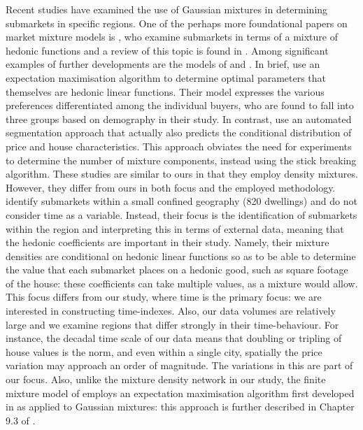 Recent studies have examined the use of Gaussian mixtures in determining submarkets in specific regions.
One of the perhaps more foundational papers on market mixture models is \cite{goodman_thibodeau_jhe1998}, who examine submarkets in terms of a mixture of hedonic functions and a review of this topic is found in \cite{islam_rurds2009}.
Among significant examples of further developments are the models of  \cite{belasco_jrer2012} and \cite{nishi_jhe2021}. In brief, \cite{belasco_jrer2012} use an expectation maximisation algorithm to determine optimal parameters that themselves are hedonic linear functions. Their model expresses the various preferences differentiated among the individual buyers, who are found to fall into three groups based on demography in their study. In contrast, \cite{nishi_jhe2021} use an automated segmentation approach that actually also predicts the conditional distribution of price and house characteristics. This approach obviates the need for experiments to determine the number of mixture components, instead using the stick breaking algorithm. These studies are similar to ours in that they employ density mixtures. However, they differ from ours in both focus and the employed methodology.  \cite{belasco_jrer2012} identify submarkets within a small confined geography (820 dwellings) and do not consider time as a variable. Instead, their focus is the identification of submarkets within the region and interpreting this in terms of external data, meaning that the hedonic coefficients are important in their study. Namely, their mixture densities are conditional on hedonic linear functions so as to be able to determine the value that each submarket places on a hedonic good, such as square footage of the house: these coefficients can take multiple values, as a mixture would allow.  This focus differs from our study, where time is the primary focus: we are interested in constructing time-indexes.
Also,  our data volumes are relatively large and we examine regions that differ strongly in their time-behaviour. For instance, the decadal time scale of our data means that doubling or tripling of house values is the norm, and even within a single city, spatially the price variation may approach an order of magnitude. The variations in this are part of our focus.
Also, unlike the mixture density network in our study, the finite mixture model of \cite{belasco_jrer2012} employs an expectation maximisation algorithm first developed in \cite{dempster_laird_rubin1977} as applied to Gaussian mixtures: this approach is further described in Chapter 9.3 of \cite{bishop2006}.


